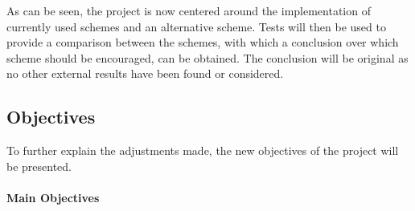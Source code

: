 \documentclass[a4paper,11pt]{article}
\begin{document}
As can be seen, the project is now centered around the implementation of currently used schemes and an alternative scheme. Tests will then be used to provide a comparison between the schemes, with which a conclusion over which scheme should be encouraged, can be obtained. The conclusion will be original as no other external results have been found or considered.
 
\subsection{Objectives}

To further explain the adjustments made, the new objectives of the project will be presented.

\paragraph{Main Objectives}
\end{document}
